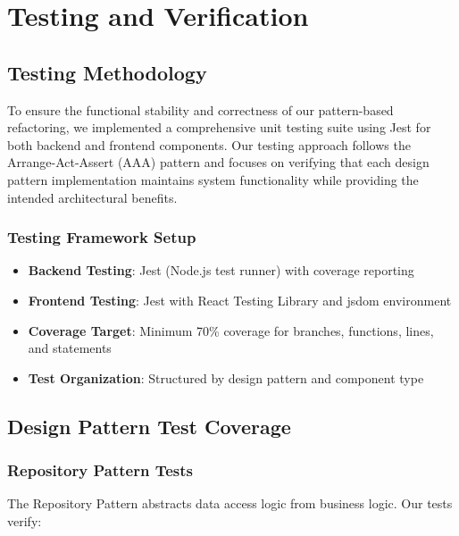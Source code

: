 \section{Testing and Verification}

\subsection{Testing Methodology}

To ensure the functional stability and correctness of our pattern-based refactoring, we implemented a comprehensive unit testing suite using Jest for both backend and frontend components. Our testing approach follows the Arrange-Act-Assert (AAA) pattern and focuses on verifying that each design pattern implementation maintains system functionality while providing the intended architectural benefits.

\subsubsection{Testing Framework Setup}

\begin{itemize}
    \item \textbf{Backend Testing}: Jest (Node.js test runner) with coverage reporting
    \item \textbf{Frontend Testing}: Jest with React Testing Library and jsdom environment
    \item \textbf{Coverage Target}: Minimum 70\% coverage for branches, functions, lines, and statements
    \item \textbf{Test Organization}: Structured by design pattern and component type
\end{itemize}

\subsection{Design Pattern Test Coverage}

\subsubsection{Repository Pattern Tests}

The Repository Pattern abstracts data access logic from business logic. Our tests verify:

